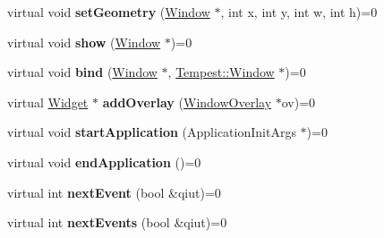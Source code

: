\begin{DoxyCompactItemize}
\item 
\hypertarget{class_tempest_1_1_system_a_p_i_a0fd3449c510d415ec4cc1c3c4740b4cd}{virtual void {\bfseries set\+Geometry} (\hyperlink{class_tempest_1_1_window}{Window} $\ast$, int x, int y, int w, int h)=0}\label{class_tempest_1_1_system_a_p_i_a0fd3449c510d415ec4cc1c3c4740b4cd}

\item 
\hypertarget{class_tempest_1_1_system_a_p_i_a7e53c953425a95645f586dffd747add9}{virtual void {\bfseries show} (\hyperlink{class_tempest_1_1_window}{Window} $\ast$)=0}\label{class_tempest_1_1_system_a_p_i_a7e53c953425a95645f586dffd747add9}

\item 
\hypertarget{class_tempest_1_1_system_a_p_i_aab855e9df8a0443c0d121b862b0e7a50}{virtual void {\bfseries bind} (\hyperlink{class_tempest_1_1_window}{Window} $\ast$, \hyperlink{class_tempest_1_1_window}{Tempest\+::\+Window} $\ast$)=0}\label{class_tempest_1_1_system_a_p_i_aab855e9df8a0443c0d121b862b0e7a50}

\item 
\hypertarget{class_tempest_1_1_system_a_p_i_a1275006829f4b464d5630a639135bd34}{virtual \hyperlink{class_tempest_1_1_widget}{Widget} $\ast$ {\bfseries add\+Overlay} (\hyperlink{struct_tempest_1_1_window_overlay}{Window\+Overlay} $\ast$ov)=0}\label{class_tempest_1_1_system_a_p_i_a1275006829f4b464d5630a639135bd34}

\item 
\hypertarget{class_tempest_1_1_system_a_p_i_a800e21c77b351d37bc41c351b5206266}{virtual void {\bfseries start\+Application} (Application\+Init\+Args $\ast$)=0}\label{class_tempest_1_1_system_a_p_i_a800e21c77b351d37bc41c351b5206266}

\item 
\hypertarget{class_tempest_1_1_system_a_p_i_a9c0e2f735f03405a660b248d012b2c4f}{virtual void {\bfseries end\+Application} ()=0}\label{class_tempest_1_1_system_a_p_i_a9c0e2f735f03405a660b248d012b2c4f}

\item 
\hypertarget{class_tempest_1_1_system_a_p_i_a635f76fca8cbdb5990dc96cec45831eb}{virtual int {\bfseries next\+Event} (bool \&qiut)=0}\label{class_tempest_1_1_system_a_p_i_a635f76fca8cbdb5990dc96cec45831eb}

\item 
\hypertarget{class_tempest_1_1_system_a_p_i_ad3a21eb53301513060c4fabedb033996}{virtual int {\bfseries next\+Events} (bool \&qiut)=0}\label{class_tempest_1_1_system_a_p_i_ad3a21eb53301513060c4fabedb033996}


\end{DoxyCompactItemize}
